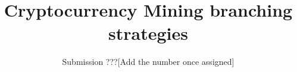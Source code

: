 \documentclass[format=acmsmall, review=false]{acmart}
\begin{document}
\title{Cryptocurrency Mining branching strategies}
\author{Submission ???[Add the number once assigned]}



\maketitle

\newpage










\newpage
\onecolumn
\appendix


\end{document}
